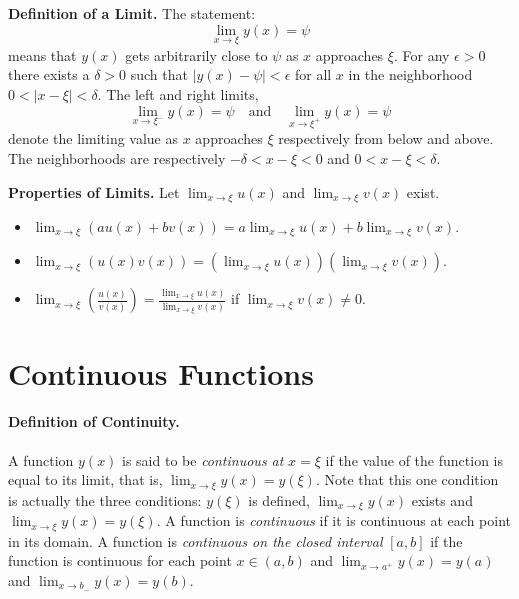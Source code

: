 \begin{Result}
  \textbf{Definition of a Limit.}
  The statement: 
  \[
  \lim_{x \to \xi} y(x) = \psi
  \]
  means that $y(x)$ gets arbitrarily close to $\psi$ as $x$ approaches $\xi$.
  For any $\epsilon > 0$ there exists a $\delta > 0$ such that 
  $|y(x) - \psi| < \epsilon$ for all $x$ in the neighborhood 
  $0 < | x - \xi | < \delta$.  The left and right limits,
  \[
  \lim_{x \to \xi^-} y(x) = \psi \quad \mathrm{and} \quad
  \lim_{x \to \xi^+} y(x) = \psi
  \]
  denote the limiting value as $x$ approaches $\xi$ respectively from 
  below and above.  The neighborhoods are respectively $-\delta < x - \xi < 0$ 
  and $0 < x - \xi < \delta$.

  \textbf{Properties of Limits.}
  Let $\displaystyle \lim_{x \to \xi} u(x)$ and 
  $\displaystyle \lim_{x \to \xi} v(x)$ exist.
  \begin{itemize}
  \item
    $\displaystyle 
    \lim_{x \to \xi} \left( a u(x) + b v(x) \right)
    = a \lim_{x \to \xi} u(x) + b \lim_{x \to \xi} v(x)
    $.
  \item
    $\displaystyle 
    \lim_{x \to \xi} \left( u(x) v(x) \right)
    = \left(\lim_{x \to \xi} u(x) \right) \left( \lim_{x \to \xi} v(x) \right)
    $.
  \item
    $\displaystyle 
    \lim_{x \to \xi} \left( \frac{u(x)}{v(x)} \right)
    = \frac{\lim_{x \to \xi} u(x)}{\lim_{x \to \xi} v(x)}
    $ 
    if 
    $\displaystyle 
    \lim_{x \to \xi} v(x) \neq 0
    $.
  \end{itemize}
\end{Result}





\section{Continuous Functions}



\paragraph{Definition of Continuity.}
A function $y(x)$ is said to be \textit{continuous at} $x = \xi$ if
the value of the function is equal to its limit, that is,
$\lim_{x \to \xi} y(x) = y(\xi)$.  Note that this one condition is 
actually the three conditions: $y(\xi)$ is defined, $\lim_{x \to \xi} y(x)$
exists and $\lim_{x \to \xi} y(x) = y(\xi)$.  A function is \textit{continuous}
if it is continuous at each point in its domain.  A function is 
\textit{continuous on the closed interval} $[a,b]$ if the function is 
continuous for each point $x \in (a,b)$ and $\lim_{x \to a^+} y(x) = y(a)$
and $\lim_{x \to b_-} y(x) = y(b)$.



